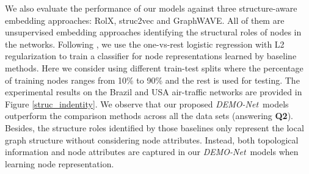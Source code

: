 \documentclass[sigconf]{acmart}
\newcommand{\demonet}{{\emph {DEMO-Net}}}
\begin{document}
We also evaluate the performance of our models against three structure-aware embedding approaches: RolX, struc2vec and GraphWAVE. All of them are unsupervised embedding approaches identifying the structural roles of nodes in the networks. Following \cite{ribeiro2017struc2vec}, we use the one-vs-rest logistic regression with L2 regularization to train a classifier for node representations learned by baseline methods. Here we consider using different train-test splits where the percentage of training nodes ranges from 10\% to 90\% and the rest is used for testing. The experimental results on the Brazil and USA air-traffic networks are provided in Figure \ref{struc_indentity}. We observe that our proposed \demonet\ models outperform the comparison methods across all the data sets (answering \textbf{Q2}). Besides, the structure roles identified by those baselines only represent the local graph structure without considering node attributes. Instead, both topological information and node attributes are captured in our \demonet\ models when learning node representation.
\end{document}
